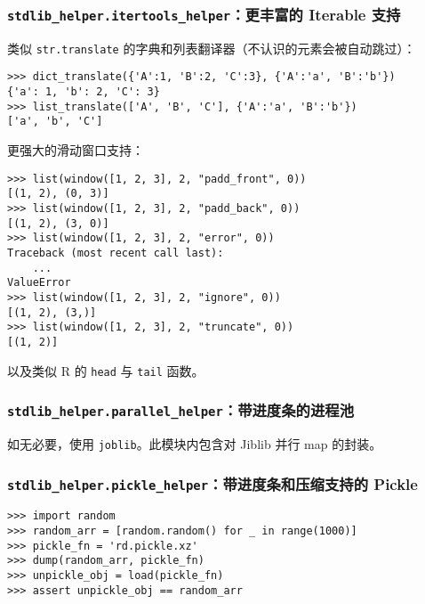 \documentclass[pdf,9pt]{beamer}
\begin{document}
    \subsubsection{\texttt{stdlib\_helper.itertools\_helper}：更丰富的 Iterable 支持}
    \begin{frame}[fragile]{\subsubsecname}
        类似 \Verb|str.translate| 的字典和列表翻译器（不认识的元素会被自动跳过）：

        \begin{verbatim}
>>> dict_translate({'A':1, 'B':2, 'C':3}, {'A':'a', 'B':'b'})
{'a': 1, 'b': 2, 'C': 3}
>>> list_translate(['A', 'B', 'C'], {'A':'a', 'B':'b'})
['a', 'b', 'C']
        \end{verbatim}

        更强大的滑动窗口支持：

        \begin{verbatim}
>>> list(window([1, 2, 3], 2, "padd_front", 0))
[(1, 2), (0, 3)]
>>> list(window([1, 2, 3], 2, "padd_back", 0))
[(1, 2), (3, 0)]
>>> list(window([1, 2, 3], 2, "error", 0))
Traceback (most recent call last):
    ...
ValueError
>>> list(window([1, 2, 3], 2, "ignore", 0))
[(1, 2), (3,)]
>>> list(window([1, 2, 3], 2, "truncate", 0))
[(1, 2)]
        \end{verbatim}

        以及类似 R 的 \Verb|head| 与 \Verb|tail| 函数。
    \end{frame}
    
    \subsubsection{\texttt{stdlib\_helper.parallel\_helper}：带进度条的进程池}

    \begin{frame}{\subsubsecname}
        如无必要，使用 \Verb|joblib|。此模块内包含对 Jiblib 并行 map 的封装。
    \end{frame}
    
    \subsubsection{\texttt{stdlib\_helper.pickle\_helper}：带进度条和压缩支持的 Pickle}

    \begin{frame}[fragile]{\subsubsecname}
        \begin{verbatim}
>>> import random
>>> random_arr = [random.random() for _ in range(1000)]
>>> pickle_fn = 'rd.pickle.xz'
>>> dump(random_arr, pickle_fn)
>>> unpickle_obj = load(pickle_fn)
>>> assert unpickle_obj == random_arr
        \end{verbatim}
    \end{frame}
    
\end{document}
